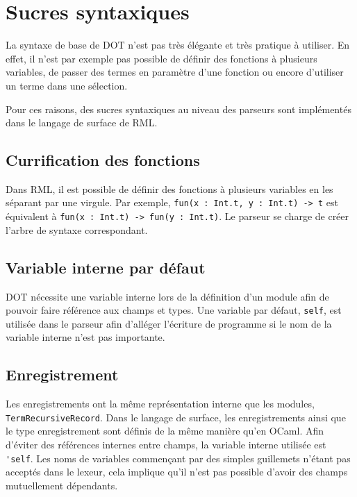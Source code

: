 \section{Sucres syntaxiques}

La syntaxe de base de DOT n'est pas très élégante et très pratique à utiliser.
En effet, il n'est par exemple pas possible de définir des fonctions à plusieurs
variables, de passer des termes en paramètre d'une fonction ou encore d'utiliser
un terme dans une sélection.

Pour ces raisons, des sucres syntaxiques au niveau des parseurs sont implémentés
dans le langage de surface de RML.

\subsection*{Currification des fonctions}

Dans RML, il est possible de définir des fonctions à plusieurs variables en les
séparant par une virgule.
Par exemple, \verb|fun(x : Int.t, y : Int.t) -> t| est équivalent à
\verb|fun(x : Int.t) -> fun(y : Int.t)|. Le parseur se charge de créer l'arbre de
syntaxe correspondant.

\subsection*{Variable interne par défaut}

DOT nécessite une variable interne lors de la définition d'un module afin de
pouvoir faire référence aux champs et types. Une variable par défaut,
\verb|self|, est utilisée dans le parseur afin d'alléger l'écriture de programme
si le nom de la variable interne n'est pas importante.

\subsection*{Enregistrement}

Les enregistrements ont la même représentation interne que les modules,
\verb|TermRecursiveRecord|. Dans le langage de surface, les enregistrements
ainsi que le type enregistrement sont définis de la même manière qu'en OCaml.
Afin d'éviter des références internes entre champs, la variable interne utilisée
est \verb|'self|. Les noms de variables commençant par des simples guillemets
n'étant pas acceptés dans le lexeur, cela implique qu'il n'est pas possible
d'avoir des champs mutuellement dépendants.


